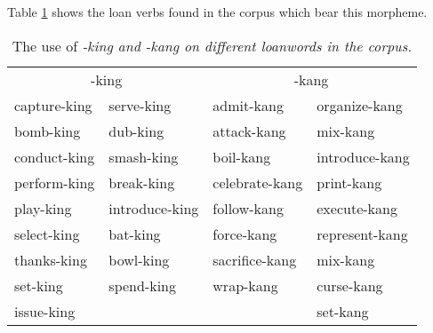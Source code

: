
Table \ref{tab:form:kingkang:loan} shows the loan verbs found in the corpus which bear this morpheme.

\begin{table} 
\begin{center}
\begin{tabular}{ll|ll}
\multicolumn{2}{c}{-king}&\multicolumn{2}{c}{-kang}\\
capture-king 	& serve-king   	& admit-kang 	& organize-kang \\
bomb-king 	& dub-king 	& attack-kang 	& mix-kang 	\\
conduct-king 	& smash-king 	& boil-kang 	& introduce-kang \\
perform-king 	& break-king 	& celebrate-kang & print-kang   \\
play-king 	& introduce-king & follow-kang 	& execute-kang \\
select-king 	& bat-king 	&  force-kang  	& represent-kang \\
thanks-king 	& bowl-king 	& sacrifice-kang & mix-kang 	\\
set-king 	& spend-king 	& wrap-kang 	& curse-kang 	\\
issue-king 	&    		&  	 	&  set-kang	\\
\end{tabular}
\end{center}
\caption{The use of \em -king \em and \em -kang \em on different loanwords in the corpus.}
\label{tab:form:kingkang:loan}
\end{table}


